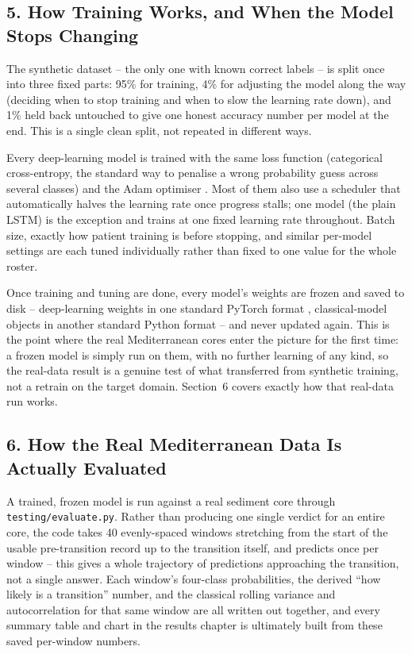 \subsection*{5. How Training Works, and When the Model Stops Changing}

The synthetic dataset -- the only one with known correct labels -- is
split once into three fixed parts: 95\% for training, 4\% for adjusting
the model along the way (deciding when to stop training and when to slow
the learning rate down), and 1\% held back untouched to give one honest
accuracy number per model at the end. This is a single clean split, not
repeated in different ways.

Every deep-learning model is trained with the same loss function
(categorical cross-entropy, the standard way to penalise a wrong
probability guess across several classes) and the Adam optimiser
\citep{kingma2015adam}. Most of them also use a scheduler that
automatically halves the learning rate once progress stalls; one model
(the plain LSTM) is the exception and trains at one fixed learning rate
throughout. Batch size, exactly how patient training is before stopping,
and similar per-model settings are each tuned individually rather than
fixed to one value for the whole roster.

Once training and tuning are done, every model's weights are frozen and
saved to disk -- deep-learning weights in one standard PyTorch format
\citep{paszke2019pytorch}, classical-model objects in another standard
Python format -- and never updated again. This is the point where the
real Mediterranean cores enter the picture for the first time: a frozen
model is simply run on them, with no further learning of any kind, so
the real-data result is a genuine test of what transferred from
synthetic training, not a retrain on the target domain. Section~6 covers
exactly how that real-data run works.

\subsection*{6. How the Real Mediterranean Data Is Actually Evaluated}

A trained, frozen model is run against a real sediment core through
\texttt{testing/evaluate.py}. Rather than producing one single verdict
for an entire core, the code takes 40 evenly-spaced windows stretching
from the start of the usable pre-transition record up to the transition
itself, and predicts once per window -- this gives a whole trajectory of
predictions approaching the transition, not a single answer. Each
window's four-class probabilities, the derived ``how likely is a
transition'' number, and the classical rolling variance and
autocorrelation for that same window are all written out together, and
every summary table and chart in the results chapter is ultimately built
from these saved per-window numbers.

